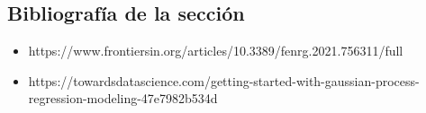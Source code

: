 \documentclass[11pt]{article}
\providecommand{\tightlist}{%
      \setlength{\itemsep}{0pt}\setlength{\parskip}{0pt}}
\begin{document}
    \subsection{Bibliografía de la
sección}\label{bibliografuxeda-de-la-secciuxf3n}

    \begin{itemize}
\tightlist
\item
  https://www.frontiersin.org/articles/10.3389/fenrg.2021.756311/full
\item
  https://towardsdatascience.com/getting-started-with-gaussian-process-regression-modeling-47e7982b534d
\end{itemize}


    
    
    
\end{document}
